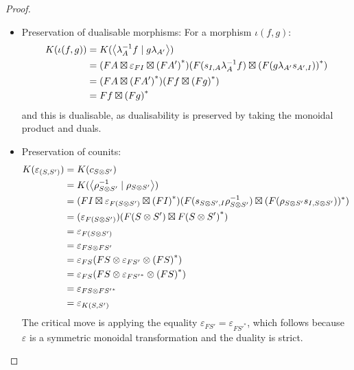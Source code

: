 \documentclass[11pt,letterpaper]{article}
\theoremstyle{plain}
\theoremstyle{definition}
\newcommand{\teletimes}{\mathbin{\boxtimes}}
\newcommand{\rep}[2]{{\ensuremath \left\langle #1 \mid #2 \right\rangle}}
\begin{document}
\begin{proof}
\begin{itemize}
\item Preservation of dualisable morphisms:  For a morphism $\iota(f, g)$:
\begin{align*}
K(\iota(f, g))
    &= K(\rep{\lambda_A^{-1} f}{g \lambda_{A'}}) \\
    &= (FA \teletimes \varepsilon_{FI} \teletimes {(FA')}^*)(F(s_{I,A}\lambda_A^{-1} f) \teletimes {(F(g \lambda_{A'}s_{A', I}))}^* ) \\
    &= (FA \teletimes {(FA')}^*)(Ff \teletimes {(Fg)}^* ) \\
    &= Ff \teletimes {(Fg)}^*
\end{align*}
and this is dualisable, as dualisability is preserved by taking the monoidal product and duals.
\item Preservation of counits:
\begin{align*}
K(\varepsilon_{(S, S')})
&= K(c_{S \otimes S'}) \\
&= K(\rep{\rho_{S \otimes S'}^{-1}}{\rho_{S \otimes S'}}) \\
&= (FI \teletimes \varepsilon_{F(S \otimes S')} \teletimes {(FI)}^*)(F(s_{S \otimes S',I}\rho_{S \otimes S'}^{-1}) \teletimes (F(\rho_{S \otimes S'} s_{I, S \otimes S'}))^* ) \\
&= (\varepsilon_{F(S \otimes S')})(F(S \otimes S') \teletimes F{(S \otimes S')}^* ) \\
&= \varepsilon_{F(S \otimes S')} \\
&= \varepsilon_{FS \otimes FS'} \\
&= \varepsilon_{FS}(FS \otimes \varepsilon_{FS'} \otimes {(FS)}^*) \\
&= \varepsilon_{FS}(FS \otimes \varepsilon_{{FS'}^*} \otimes {(FS)}^*) \\
&= \varepsilon_{FS \otimes {FS'}^*} \\
&= \varepsilon_{K(S, S')}
\end{align*}
The critical move is applying the equality $\varepsilon_{FS'} = \varepsilon_{{FS'}^*}$, which follows because $\varepsilon$ is a symmetric monoidal transformation and the duality is strict.
\end{itemize}


\end{proof}
\end{document}
